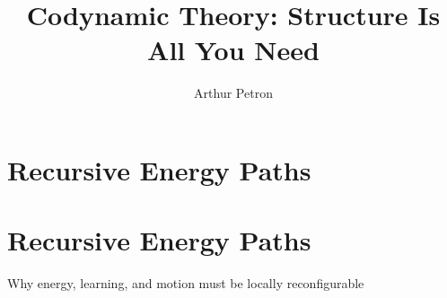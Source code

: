\documentclass[11pt]{article}
\title{Codynamic Theory: Structure Is All You Need}
\author{Arthur Petron}
\begin{document}
\section*{Recursive Energy Paths}

\section{Recursive Energy Paths}

Why energy, learning, and motion must be locally reconfigurable
\end{document}
